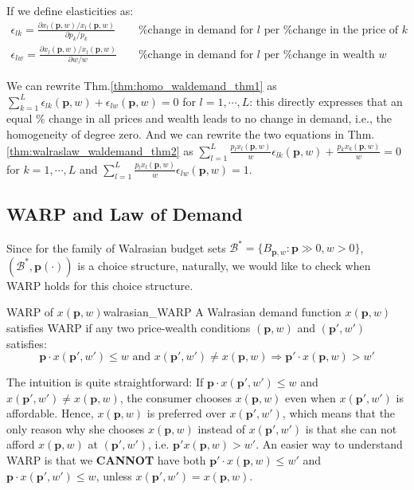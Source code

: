 If we define elasticities as:
\begin{align*} 
    \epsilon_{lk}=\frac{\partial x_l(\mathbf{p},w)/x_l(\mathbf{p},w)}{\partial p_k /p_k} && \text{ \% change in demand for $l$ per \% change in the price of $k$} \\ 
    \epsilon_{lw}=\frac{\partial x_l(\mathbf{p},w)/x_l(\mathbf{p},w)}{\partial w/w} && \text{ \% change in demand for $l$ per \% change in wealth $w$}
\end{align*}

We can rewrite Thm.\ref{thm:homo_waldemand_thm1} as $\sum^L_{k=1}\epsilon_{lk}(\mathbf{p},w)+\epsilon_{lw}(\mathbf{p},w)=0$ for $l=1,\cdots,L$: this directly expresses that an equal \% change in all prices and wealth leads to no change in demand, i.e., the homogeneity of degree zero.
And we can rewrite the two equations in Thm.\ref{thm:walraslaw_waldemand_thm2} as $\sum^L_{l=1}\frac{p_lx_l(\mathbf{p},w)}{w}\epsilon_{lk}(\mathbf{p},w)+\frac{p_kx_k(\mathbf{p},w)}{w}=0$ for $k=1,\cdots,L$ and $\sum^L_{l=1}\frac{p_lx_l(\mathbf{p},w)}{w}\epsilon_{lw}(\mathbf{p},w)=1$.

\subsection{WARP and Law of Demand}
Since for the family of Walrasian budget sets $\mathcal{B}^*=\{B_{\mathbf{p},w}:\mathbf{p}\gg 0,w>0\}$, $(\mathcal{B}^*,\mathbf{p}(\cdot))$ is a choice structure, naturally, we would like to check when WARP holds for this choice structure.

\begin{definition}{WARP of $ x(\mathbf{p},w)$}{walrasian_WARP}
    A Walrasian demand function $ x(\mathbf{p},w)$ satisfies WARP if any two price-wealth conditions $(\mathbf{p},w)$ and $(\mathbf{p}',w')$ satisfies:
    $$\mathbf{p}\cdot  x(\mathbf{p}',w')\leq w\text{ and } x(\mathbf{p}',w')\neq  x(\mathbf{p},w)\Rightarrow \mathbf{p}'\cdot x(\mathbf{p},w)>w'$$
\end{definition}

The intuition is quite straightforward: If $\mathbf{p}\cdot  x(\mathbf{p}',w')\leq w$ and $ x(\mathbf{p}',w')\neq  x(\mathbf{p},w)$, the consumer chooses $ x(\mathbf{p},w)$ even when $ x(\mathbf{p}',w')$ is affordable. Hence, $ x(\mathbf{p},w)$ is preferred over $ x(\mathbf{p}',w')$, which means that the only reason why she chooses $ x(\mathbf{p},w)$ instead of $ x(\mathbf{p}',w')$ is that she can not afford $ x(\mathbf{p},w)$ at $(\mathbf{p}',w')$, i.e. $\mathbf{p}' x(\mathbf{p},w)>w'$. An easier way to understand WARP is that we \textbf{CANNOT} have both $\mathbf{p}'\cdot  x(\mathbf{p},w)\leq w'$ and $\mathbf{p}\cdot  x(\mathbf{p}',w')\leq w$, unless $ x(\mathbf{p}',w')= x(\mathbf{p},w)$.


